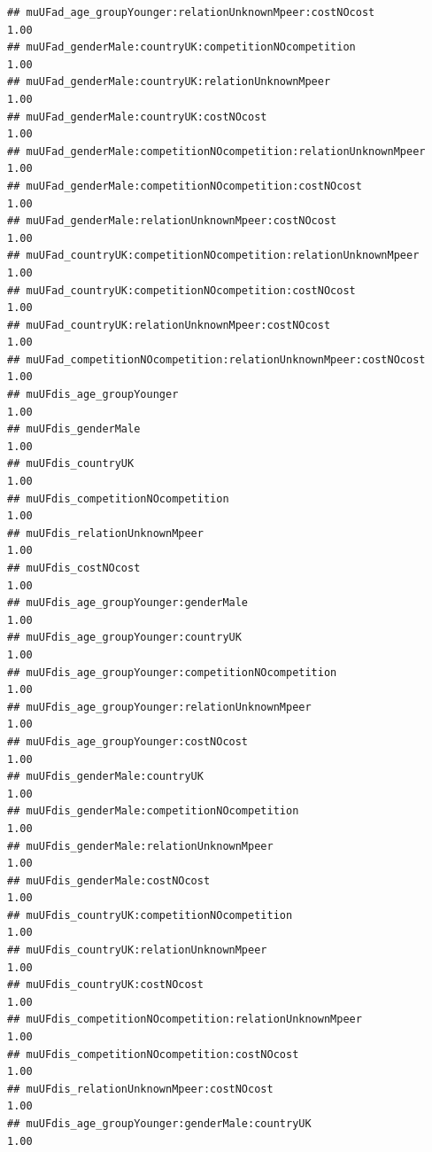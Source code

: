 \documentclass[
]{article}
\begin{document}
\begin{verbatim}
## muUFad_age_groupYounger:relationUnknownMpeer:costNOcost                1.00
## muUFad_genderMale:countryUK:competitionNOcompetition                   1.00
## muUFad_genderMale:countryUK:relationUnknownMpeer                       1.00
## muUFad_genderMale:countryUK:costNOcost                                 1.00
## muUFad_genderMale:competitionNOcompetition:relationUnknownMpeer        1.00
## muUFad_genderMale:competitionNOcompetition:costNOcost                  1.00
## muUFad_genderMale:relationUnknownMpeer:costNOcost                      1.00
## muUFad_countryUK:competitionNOcompetition:relationUnknownMpeer         1.00
## muUFad_countryUK:competitionNOcompetition:costNOcost                   1.00
## muUFad_countryUK:relationUnknownMpeer:costNOcost                       1.00
## muUFad_competitionNOcompetition:relationUnknownMpeer:costNOcost        1.00
## muUFdis_age_groupYounger                                               1.00
## muUFdis_genderMale                                                     1.00
## muUFdis_countryUK                                                      1.00
## muUFdis_competitionNOcompetition                                       1.00
## muUFdis_relationUnknownMpeer                                           1.00
## muUFdis_costNOcost                                                     1.00
## muUFdis_age_groupYounger:genderMale                                    1.00
## muUFdis_age_groupYounger:countryUK                                     1.00
## muUFdis_age_groupYounger:competitionNOcompetition                      1.00
## muUFdis_age_groupYounger:relationUnknownMpeer                          1.00
## muUFdis_age_groupYounger:costNOcost                                    1.00
## muUFdis_genderMale:countryUK                                           1.00
## muUFdis_genderMale:competitionNOcompetition                            1.00
## muUFdis_genderMale:relationUnknownMpeer                                1.00
## muUFdis_genderMale:costNOcost                                          1.00
## muUFdis_countryUK:competitionNOcompetition                             1.00
## muUFdis_countryUK:relationUnknownMpeer                                 1.00
## muUFdis_countryUK:costNOcost                                           1.00
## muUFdis_competitionNOcompetition:relationUnknownMpeer                  1.00
## muUFdis_competitionNOcompetition:costNOcost                            1.00
## muUFdis_relationUnknownMpeer:costNOcost                                1.00
## muUFdis_age_groupYounger:genderMale:countryUK                          1.00

\end{verbatim}
\end{document}

